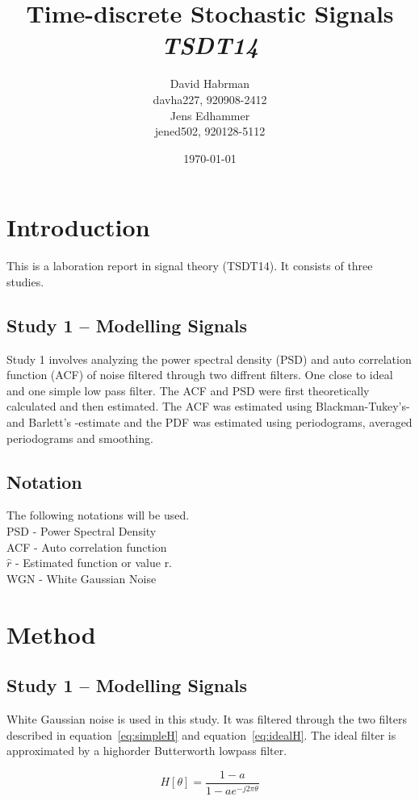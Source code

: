 \documentclass[10pt]{article}
\title{Time-discrete Stochastic Signals\\
\emph{TSDT14}}
\author{David Habrman \\ davha227, 920908-2412\\
Jens Edhammer \\ jened502, 920128-5112 }
\date{\today}
\begin{document}
\maketitle

\section{Introduction}
This is a laboration report in signal theory (TSDT14). It consists of three studies.

\subsection{Study 1 – Modelling Signals}
Study 1 involves analyzing the power spectral density (PSD) and auto correlation function (ACF)
of noise filtered through two diffrent filters. One close to ideal and one simple low pass filter.
The ACF and PSD were first theoretically calculated and then estimated.
The ACF was estimated using Blackman-Tukey's- and Barlett's -estimate and the
PDF was estimated using periodograms, averaged periodograms and smoothing.

\subsection{Notation}
The following notations will be used. \\
PSD - Power Spectral Density \\
ACF - Auto correlation function \\
$\hat{r}$ - Estimated function or value r. \\
WGN - White Gaussian Noise

\section{Method}
\subsection{Study 1 – Modelling Signals}

White Gaussian noise is used in this study. It was filtered through the two
 filters described in equation~\ref{eq:simpleH} and equation~\ref{eq:idealH}.
 The ideal filter is approximated by a highorder Butterworth lowpass filter.

\begin{equation}
  \label{eq:simpleH}
  H[\theta] =\frac{1-a}{1-ae^{-j2\pi\theta }}
\end{equation}
\end{document}
